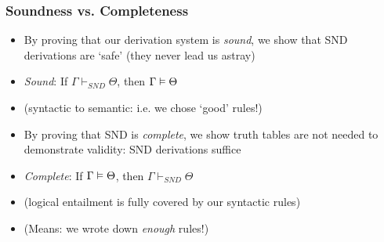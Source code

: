 \begin{frame}
\frametitle{Soundness vs. Completeness}



\begin{itemize}[<+->]

\item By proving that our derivation system is \textit{sound}, we show that SND derivations are `safe' (they never lead us astray)

\medskip 

\bi

\item \emph{Sound}: If $\Gamma \vdash_{SND} \Theta$, then $\Gamma \vDash \Theta$

\item (syntactic to semantic: i.e. we chose `good' rules!)

\ei

\bigskip 

\item By proving that SND is \textit{complete}, we show truth tables are not needed to demonstrate validity: SND derivations suffice

\medskip 

\bi

\item \emph{Complete}: If $\Gamma \vDash \Theta$, then $\Gamma \vdash_{SND} \Theta$

\item (logical entailment is fully covered by our syntactic rules)

\item (Means: we wrote down \textit{enough} rules!)

\ei

\end{itemize}
\end{frame}



